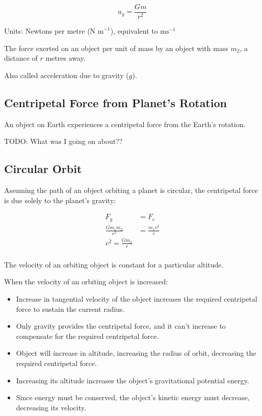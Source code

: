\documentclass[a4paper,11pt]{article}
\begin{document}
$$
a_g = \frac{G m}{r^2}
$$

Units: Newtons per metre ($\mbox{N m}^{-1}$), equivalent to $\mbox{ms}^{-1}$

The force exerted on an object per unit of mass by an object with mass $m_2$,
a distance of $r$ metres away.

Also called acceleration due to gravity ($g$).


\subsection{Centripetal Force from Planet's Rotation}

An object on Earth experiences a centripetal force from the Earth's rotation.

TODO: What was I going on about??


\subsection{Circular Orbit}

Assuming the path of an object orbiting a planet is circular, the centripetal
force is due solely to the planet's gravity:

$$
\begin{aligned}
F_g & = F_c \\
\frac{G m_1 m_2}{r^2} & = \frac{m_1 v^2}{r} \\
v^2 = \frac{G m_2}{r} \\
\end{aligned}
$$

The velocity of an orbiting object is constant for a particular altitude.

When the velocity of an orbiting object is increased:

\begin{itemize}
\item Increase in tangential velocity of the object increases the required
	centripetal force to sustain the current radius.
\item Only gravity provides the centripetal force, and it can't increase to
	compensate for the required centripetal force.
\item Object will increase in altitude, increasing the radius of orbit,
	decreasing the required centripetal force.
\item Increasing its altitude increases the object's gravitational potential
	energy.
\item Since energy must be conserved, the object's kinetic energy must
	decrease, decreasing its velocity.
\end{itemize}
\end{document}
